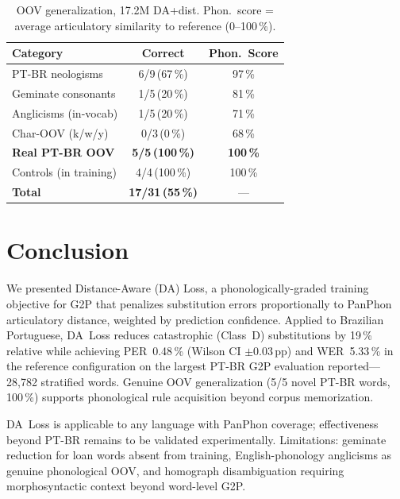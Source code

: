\documentclass[conference]{IEEEtran}
\begin{document}
\begin{table}[t]
  \caption{OOV generalization, 17.2M DA+dist. Phon.\ score =
           average articulatory similarity to reference (0--100\,\%).}
  \label{tab:oov}
  \centering\small
  \begin{tabular}{lcc}
    \toprule
    Category & Correct & Phon.\ Score \\
    \midrule
    PT-BR neologisms        & 6/9\,(67\,\%)   & 97\,\% \\
    Geminate consonants     & 1/5\,(20\,\%)   & 81\,\% \\
    Anglicisms (in-vocab)   & 1/5\,(20\,\%)   & 71\,\% \\
    Char-OOV (k/w/y)        & 0/3\,(0\,\%)    & 68\,\% \\
    \textbf{Real PT-BR OOV} & \textbf{5/5\,(100\,\%)} & \textbf{100\,\%} \\
    Controls (in training)  & 4/4\,(100\,\%)  & 100\,\% \\
    \midrule
    \textbf{Total}          & \textbf{17/31\,(55\,\%)} & --- \\
    \bottomrule
  \end{tabular}
\end{table}

\section{Conclusion}

We presented Distance-Aware (DA) Loss, a phonologically-graded
training objective for G2P that penalizes substitution errors
proportionally to PanPhon articulatory distance, weighted by
prediction confidence.
Applied to Brazilian Portuguese, DA~Loss reduces catastrophic
(Class~D) substitutions by 19\,\% relative while achieving
PER~0.48\,\% (Wilson CI $\pm$0.03\,pp) and WER~5.33\,\% in the
reference configuration on the largest PT-BR G2P evaluation
reported---28{,}782 stratified words.
Genuine OOV generalization (5/5 novel PT-BR words, 100\,\%)
supports phonological rule acquisition beyond corpus memorization.

DA~Loss is applicable to any language with PanPhon coverage;
effectiveness beyond PT-BR remains to be validated experimentally.
Limitations: geminate reduction for loan words absent from training,
English-phonology anglicisms as genuine phonological OOV, and
homograph disambiguation requiring morphosyntactic context beyond
word-level G2P.
\end{document}
